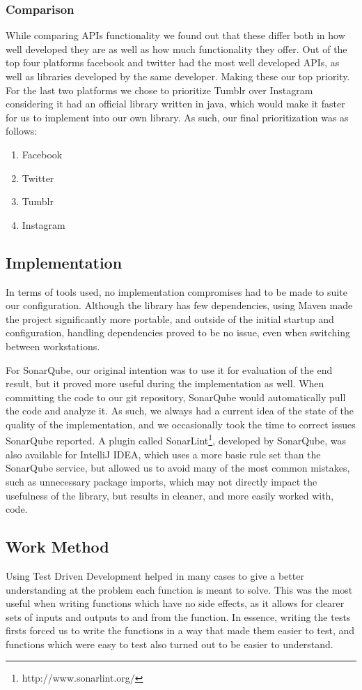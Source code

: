 \documentclass{sigchi-alternate}
\begin{document}
\subsubsection{Comparison}
While comparing APIs functionality we found out that these differ both in how well developed they are as well as how much functionality they offer. Out of the top four platforms facebook and twitter
had the most well developed APIs, as well as libraries developed by the same developer. Making these our top priority. For the last two platforms we chose to prioritize Tumblr over Instagram considering
it had an official library written in java, which would make it faster for us to implement into our own library. As such, our final prioritization was as follows:
\begin{enumerate}
	\item Facebook
	\item Twitter
	\item Tumblr
	\item Instagram
\end{enumerate}

\subsection{Implementation}
In terms of tools used, no implementation compromises had to be made to suite our configuration. Although the library has few dependencies, using Maven made the project significantly more portable, and outside of the
initial startup and configuration, handling dependencies proved to be no issue, even when switching between workstations.

For SonarQube, our original intention was to use it for evaluation of the end result, but it proved more useful during the implementation as well. When committing the code to our git repository, SonarQube would automatically
pull the code and analyze it. As such, we always had a current idea of the state of the quality of the implementation, and we occasionally took the time to correct issues SonarQube reported. A plugin called SonarLint\footnote{http://www.sonarlint.org/},
developed by SonarQube, was also available for IntelliJ IDEA, which uses a more basic rule set than the SonarQube service, but allowed us to avoid many of the most common mistakes, such as unnecessary package imports,
which may not directly impact the usefulness of the library, but results in cleaner, and more easily worked with, code.

\subsection{Work Method}
Using Test Driven Development helped in many cases to give a better understanding at the problem each function is meant to solve. This was the most useful when writing functions which have no side effects, as it allows
for clearer sets of inputs and outputs to and from the function. In essence, writing the tests firsts forced us to write the functions in a way that made them easier to test, and functions which were easy to test also
turned out to be easier to understand.
\end{document}
